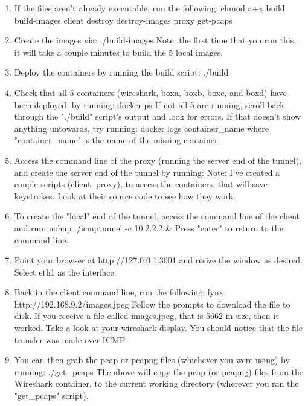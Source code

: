 \begin{enumerate}
    \item If the files aren't already executable, run the following: chmod a+x build build-images client destroy destroy-images proxy get-pcaps
    \item Create the images via: ./build-images
    Note: the first time that you run this, it will take a couple minutes to build the 5 local images.
    \item Deploy the containers by running the build script: ./build
    \item Check that all 5 containers (wireshark, boxa, boxb, boxc, and boxd) have been deployed, by running: docker ps
    If not all 5 are running, scroll back through the "./build" script's output and look for errors. 
    If that doesn't show anything untowards, try running: docker logs container\_name where "container\_name" is the name of the missing container.
    \item Access the command line of the proxy (running the server end of the tunnel), and create the server end of the tunnel by running:
    Note: I've created a couple scripts (client, proxy), to access the containers, that will save keystrokes. Look at their source code to see how they work.
    \item To create the "local" end of the tunnel, access the command line of the client and run: nohup ./icmptunnel -c 10.2.2.2 \& 
    Press "enter" to return to the command line.
    \item Point your browser at http://127.0.0.1:3001 and resize the window as desired. Select eth1 as the interface. 
    \item Back in the client command line, run the following: lynx http://192.168.9.2/images.jpeg 
    Follow the prompts to download the file to disk. If you receive a file called images.jpeg, that is 5662 in size, then it worked. Take a look at your wireshark display. You should notice that the file transfer was made over ICMP.
    \item You can then grab the pcap or pcapng files (whichever you were using) by running: ./get\_pcaps
    The above will copy the pcap (or pcapng) files from the Wireshark container, to the current working directory (wherever you ran the "get\_pcaps" script).
\end{enumerate}

